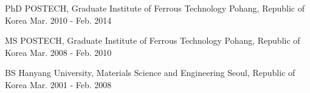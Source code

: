 

\begin{cventries}

  \cventry
  {PhD} %
  {POSTECH, Graduate Institute of Ferrous Technology} %
  {Pohang, Republic of Korea} %
  {Mar. 2010 - Feb. 2014} %
  {
  }

  \cventry
  {MS} %
  {POSTECH, Graduate Institute of Ferrous Technology} %
  {Pohang, Republic of Korea} %
  {Mar. 2008 - Feb. 2010} %
  {
  }

  \cventry
  {BS} %
  {Hanyang University, Materials Science and Engineering} %
  {Seoul, Republic of Korea} %
  {Mar. 2001 - Feb. 2008} %
  {
  }

\end{cventries}
